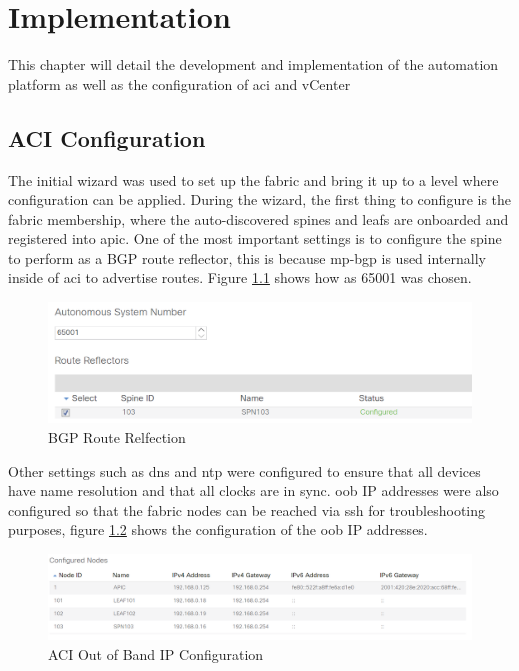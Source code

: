 \chapter{Implementation}
\label{chap:implementation}
This chapter will detail the development and implementation of the automation
platform as well as the configuration of \gls{aci} and vCenter
\section{ACI Configuration}
The initial wizard was used to set up the fabric and bring it up to a level
where configuration can be applied. During the wizard, the first thing to
configure is the fabric membership, where the auto-discovered spines and leafs
are onboarded and registered into \gls{apic}.
One of the most important settings is to configure the spine to perform as a
BGP route reflector, this is because \gls{mp-bgp} is used internally inside of
\gls{aci} to advertise routes. Figure \ref{fig:bgp-reflection} shows how
\gls{as} 65001 was chosen.

\begin{figure}[H]

    \centering
    \includegraphics[scale=0.5]{images/bgp-reflection.png}

    \caption{BGP Route Relfection}
    \label{fig:bgp-reflection}
\end{figure}

Other settings such as \gls{dns} and \gls{ntp} were configured to ensure that
all devices have name resolution and that all clocks are in sync.
\gls{oob} IP addresses were also configured so that the fabric nodes can be
reached via \gls{ssh} for troubleshooting purposes, figure \ref{fig:aci-oob-ip}
shows the configuration of the \gls{oob} IP addresses.

\begin{figure}[H]

    \centering
    \includegraphics[scale=0.5]{images/aci-oob-ip.png}

    \caption{ACI Out of Band IP Configuration}
    \label{fig:aci-oob-ip}
\end{figure}


